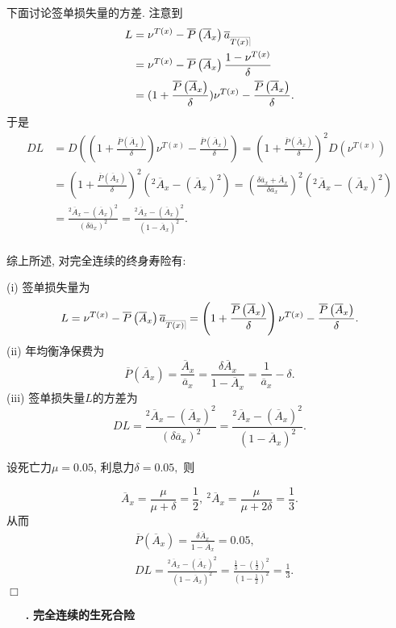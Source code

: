 \documentclass[a4paper,openany, 10pt]{ctexbook}
\makeatletter
\def\qed{\hfill$\Box$\medskip}
\def\z{\left}
\def\y{\right}
\DeclareRobustCommand{\annu}[1]{_{%
    \def\arraystretch{0}%
    \setlength\arraycolsep{1pt}%
    \setlength\arrayrulewidth{.2pt}%
    \begin{array}[b]{@{}c|}\hline
        \\[\arraycolsep]%
        \scriptstyle #1%
    \end{array}%
}}
\makeatother
\begin{document}
下面讨论签单损失量的方差. 注意到
\begin{align*}
  L&=\nu^{T(x)}-\overline{P}\left( \overline{A}_x \right)\overline a_{\annu {T(x)}}\\
  &=\nu^{T(x)}-\overline{P}\left( \overline{A}_x \right)\frac{1-\nu^{T(x)}}{\delta}\\
  &=(1+\frac{\overline{P}\left( \overline{A}_x \right)}{\delta})\nu^{T(x)}-\frac{\overline{P}\left( \overline{A}_x \right)}{\delta}.
\end{align*}
于是
\begin{align*}
    DL & =D\z((1+\frac{\overline{P}\left( \overline{A}_x \right)}{\delta})\nu^{T(x)}-\frac{\overline{P}\left( \overline{A}_x \right)}{\delta}\y)
    =\z(1+\frac{\overline{P}\left( \overline{A}_x \right)}{\delta}\y)^2D(\nu^{T(x)}) \\
        & =\z(1+\frac{\overline{P}\left( \overline{A}_x \right)}{\delta}\y)^2 \z({}^2\overline A_x-(\overline A_x)^2\y)=\z(\frac{\delta\overline a_x+\overline A_x}{\delta \overline a_x}\y)^2 \z({}^2\overline A_x-(\overline A_x)^2\y)\\
        &=\frac{^2\overline A_x-(\overline A_x)^2}{(\delta\overline a_x)^2}=\frac{^2\overline A_x-(\overline A_x)^2}{(1-\overline A_x)^2}.\\
\end{align*}

综上所述, 对完全连续的终身寿险有:

\noindent(i) 签单损失量为
$$L=\nu^{T(x)}-\overline{P}\left( \overline{A}_x \right)\overline a_{\annu {T(x)}}=\z(1+\frac{\overline{P}\left( \overline{A}_x \right)}{\delta}\y)\nu^{T(x)}-\frac{\overline{P}\left( \overline{A}_x \right)}{\delta}.$$
\noindent(ii) 年均衡净保费为$$\overline{P}\left( \overline{A}_x \right)=\frac{\overline A_x}{\overline a_x}=\frac{\delta\overline A_x}{1-\overline A_x}=\frac{1}{\overline a_x}-\delta.$$
\noindent(iii) 签单损失量$L$的方差为
$$DL=\frac{^2\overline A_x-(\overline A_x)^2}{(\delta\overline a_x)^2}=\frac{^2\overline A_x-(\overline A_x)^2}{(1-\overline A_x)^2}.$$
\begin{example}
   设死亡力$\mu=0.05$, 利息力$\delta=0.05,$ 则
\end{example}
$$\overline A_x=\frac{\mu}{\mu+\delta}=\frac{1}{2},\ {}^2\overline A_x=\frac{\mu}{\mu+2\delta}=\frac{1}{3}.$$
从而
\begin{align*}
  &\overline{P}\left( \overline{A}_x \right)=\frac{\delta\overline A_x}{1-\overline A_x}=0.05,\\
&DL=\frac{^2\overline A_x-(\overline A_x)^2}{(1-\overline A_x)^2}=\frac{\frac{1}{3}-(\frac{1}{2})^2}{(1-\frac{1}{2})^2}=\frac{1}{3}.
\end{align*}
\qed
\begin{itemize}
  \item[{\bf\heiti 2.}]{\bf\heiti 完全连续的生死合险 }
\end{itemize}
\end{document}
